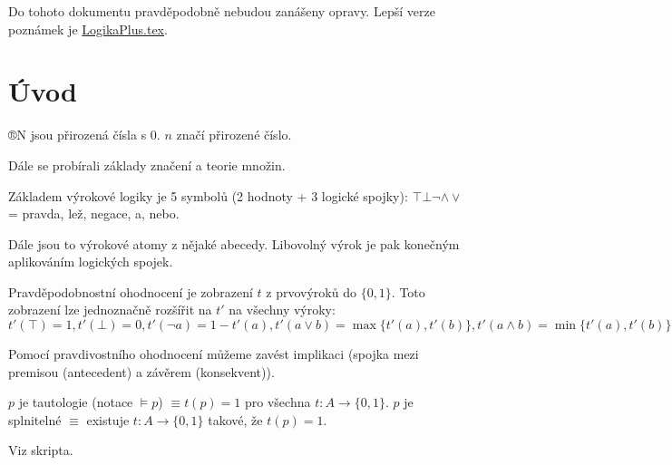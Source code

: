 \documentclass[12pt]{article}                   %
\begin{document}
\begin{poznamka}
    Do tohoto dokumentu pravděpodobně nebudou zanášeny opravy. Lepší verze poznámek je \href{./LogikaPlus.pdf}{LogikaPlus.tex}.
\end{poznamka}

\section{Úvod}
    \begin{poznamka}[Domluva]
        ®N jsou přirozená čísla s 0. $n$ značí přirozené číslo.
    \end{poznamka}

    Dále se probírali základy značení a teorie množin.


    \begin{definice}[Základy]
        Základem výrokové logiky je 5 symbolů (2 hodnoty + 3 logické spojky): $\top \bot \neg \land \lor$ = pravda, lež, negace, a, nebo.

        Dále jsou to výrokové atomy z nějaké abecedy. Libovolný výrok je pak konečným aplikováním logických spojek.
    \end{definice}

    \begin{definice}
        Pravděpodobnostní ohodnocení je zobrazení $t$ z prvovýroků do $\{0, 1\}$. Toto zobrazení lze jednoznačně rozšířit na $t'$ na všechny výroky:
        $$ t'(\top) = 1, t'(\bot) = 0, t'(\neg a) = 1 - t'(a), t'(a \lor b) = \max\{t'(a), t'(b)\}, t'(a \land b) = \min\{t'(a), t'(b)\} $$ 
    \end{definice}

    \begin{definice}
        Pomocí pravdivostního ohodnocení můžeme zavést implikaci (spojka mezi premisou (antecedent) a závěrem (konsekvent)).
    \end{definice}

    \begin{definice}[Tautologie]
        $p$ je tautologie (notace $\models p$) $≡ t(p) = 1$ pro všechna $t: A \rightarrow \{0, 1\}$. $p$ je splnitelné $≡$ existuje $t: A \rightarrow \{0, 1\}$ takové, že $t(p) = 1$.
    \end{definice}

    \begin{lemma}
        Viz skripta.
    \end{lemma}
\end{document}
